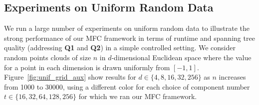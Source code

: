 \subsection{Experiments on Uniform Random Data}
\label{sec:nincreases}
We run a large number of experiments on uniform random data to illustrate the strong performance of our MFC framework in terms of runtime and spanning tree quality (addressing \textbf{Q1} and \textbf{Q2}) in a simple controlled setting. We consider random points clouds of size $n$ in $d$-dimensional Euclidean space where the value for a point in each dimension is drawn uniformly from $[-1,1]$. Figure~\ref{fig:unif_grid_aux} show results for $d \in \{4,8,16,32,256\}$ as $n$ increases from 1000 to 30000, using a different color for each choice of component number $t \in \{16,32,64,128,256\}$ for which we ran our MFC framework. 




